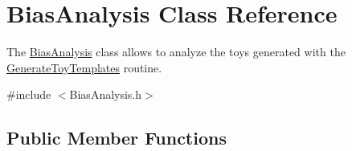\hypertarget{classBiasAnalysis}{\section{Bias\+Analysis Class Reference}
\label{classBiasAnalysis}
}


The \hyperlink{classBiasAnalysis}{Bias\+Analysis} class allows to analyze the toys generated with the \hyperlink{namespaceGenerateToyTemplates}{Generate\+Toy\+Templates} routine.  




{\ttfamily \#include $<$Bias\+Analysis.\+h$>$}

\subsection*{Public Member Functions}

